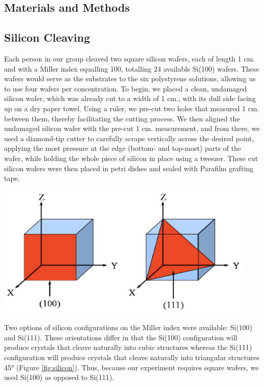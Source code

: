 \documentclass{article}
\newenvironment{Figure}
  {\par\medskip\noindent\minipage{\linewidth}}
  {\endminipage\par\medskip}
\begin{document}
\begin{multicols}{2}
        \section{Materials and Methods}
            \subsection{Silicon Cleaving}
            Each person in our group cleaved two square silicon wafers, each of length 1 cm. and with a Miller index equalling 100, totalling 24 available Si(100) wafers. These wafers would serve as the substrates to the six polystyrene solutions, allowing us to use four wafers per concentration. To begin, we placed a clean, undamaged silicon wafer, which was already cut to a width of 1 cm., with its dull side facing up on a dry paper towel. Using a ruler, we pre-cut two holes that measured 1 cm. between them, thereby facilitating the cutting process. We then aligned the undamaged silicon wafer with the pre-cut 1 cm. measurement, and from there, we used a diamond-tip cutter to carefully scrape vertically across the desired point, applying the most pressure at the edge (bottom- and top-most) parts of the wafer, while holding the whole piece of silicon in place using a tweezer. These cut silicon wafers were then placed in petri dishes and sealed with Parafilm grafting tape.

            \begin{Figure}
                \centering
                \includegraphics[width=0.8\columnwidth]{img/silicon.png}
                \label{fig:silicon}
            \end{Figure}

            Two options of silicon configurations on the Miller index were available: Si(100) and Si(111). These orientations differ in that the Si(100) configuration will produce crystals that cleave naturally into cubic structures whereas the Si(111) configuration will produce crystals that cleave naturally into triangular structures 45° (Figure \ref{fig:silicon}). Thus, because our experiment requires square wafers, we used Si(100) as opposed to Si(111).


\end{multicols}
\end{document}
